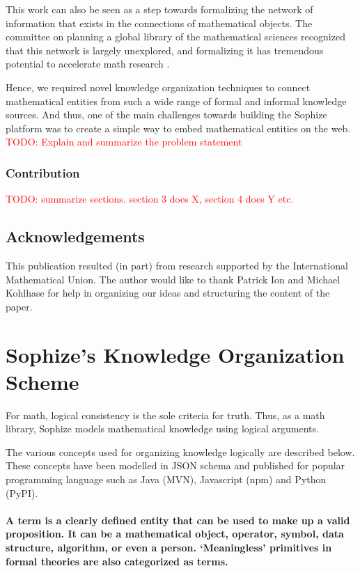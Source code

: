 \documentclass[a4paper]{article}
\newcommand\todo[1]{\textcolor{red}{TODO: #1}}
\begin{document}
This work can also be seen as a step towards formalizing the network of information that exists in the connections of mathematical objects. The committee on planning a global library of the mathematical sciences recognized that this network is largely unexplored, and formalizing it has tremendous potential to accelerate math research \cite{sciences2014developing}.

Hence, we required novel knowledge organization techniques to connect mathematical entities from such a wide range of formal and informal knowledge sources. And thus, one of the main challenges towards building the Sophize platform was to create a simple way to embed mathematical entities on the web. \todo{Explain and summarize the problem statement}


\subsubsection*{Contribution}
\todo{summarize sections. section 3 does X, section 4 does Y etc.}

\subsection*{Acknowledgements}
This publication resulted (in part) from research supported by the International Mathematical Union. The author would like to thank Patrick Ion and Michael Kohlhase for help in organizing our ideas and structuring the content of the paper.

\section{Sophize's Knowledge Organization Scheme}
For math, logical consistency is the sole criteria for truth. Thus, as a math library, Sophize models mathematical knowledge using logical arguments. 

The various concepts used for organizing knowledge logically are described below. These concepts have been modelled in JSON schema \cite{sophize_datamodel} and published for popular programming language such as Java (MVN), Javascript (npm) and Python (PyPI). 

\paragraph{A \textbf{term} is a clearly defined entity that can be used to make up a valid proposition. It can be a mathematical object, operator, symbol, data structure, algorithm, or even a person. `Meaningless' primitives in formal theories are also categorized as terms.}
\end{document}
